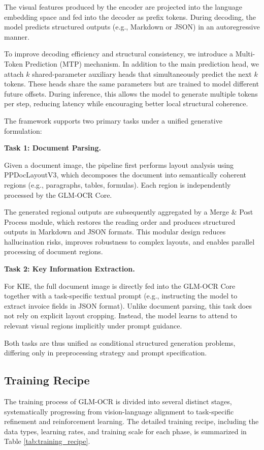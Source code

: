 The visual features produced by the encoder are projected into the language embedding space and fed into the decoder as prefix tokens. During decoding, the model predicts structured outputs (e.g., Markdown or JSON) in an autoregressive manner.

To improve decoding efficiency and structural consistency, we introduce a Multi-Token Prediction (MTP) mechanism. In addition to the main prediction head, we attach $k$ shared-parameter auxiliary heads that simultaneously predict the next $k$ tokens. These heads share the same parameters but are trained to model different future offsets. During inference, this allows the model to generate multiple tokens per step, reducing latency while encouraging better local structural coherence. 

The framework supports two primary tasks under a unified generative formulation:

\textbf{Task 1: Document Parsing.} 

Given a document image, the pipeline first performs layout analysis using PPDocLayoutV3, which decomposes the document into semantically coherent regions (e.g., paragraphs, tables, formulas). Each region is independently processed by the GLM-OCR Core.

The generated regional outputs are subsequently aggregated by a Merge \& Post Process module, which restores the reading order and produces structured outputs in Markdown and JSON formats. This modular design reduces hallucination risks, improves robustness to complex layouts, and enables parallel processing of document regions.

\textbf{Task 2: Key Information Extraction.} 

For KIE, the full document image is directly fed into the GLM-OCR Core together with a task-specific textual prompt (e.g., instructing the model to extract invoice fields in JSON format). Unlike document parsing, this task does not rely on explicit layout cropping. Instead, the model learns to attend to relevant visual regions implicitly under prompt guidance.

Both tasks are thus unified as conditional structured generation problems, differing only in preprocessing strategy and prompt specification.


\subsection{Training Recipe}

The training process of GLM-OCR is divided into several distinct stages, systematically progressing from vision-language alignment to task-specific refinement and reinforcement learning. The detailed training recipe, including the data types, learning rates, and training scale for each phase, is summarized in Table \ref{tab:training_recipe}.

